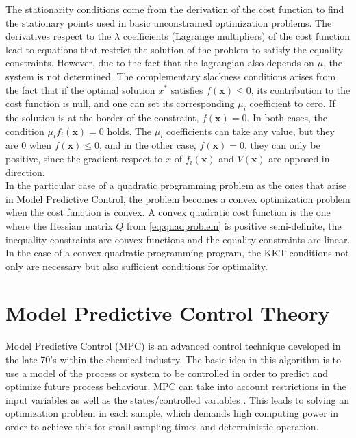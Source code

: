 The stationarity conditions come from the derivation of the cost function to find the stationary points used in basic unconstrained optimization problems. The derivatives respect to the $\lambda$ coefficients (Lagrange multipliers) of the cost function lead to equations that restrict the solution of the problem to satisfy the equality constraints. However, due to the fact that the lagrangian also depends on $\mu$, the system is not determined. The complementary slackness conditions arises from the fact that if the optimal solution $x^{*}$ satisfies $f(\mathbf{x}) \leq 0$, its contribution to the cost function is null, and one can set its corresponding $\mu_{i}$ coefficient to cero. If the solution is at the border of the constraint,  $f(\mathbf{x}) = 0$. In both cases, the condition $\mu_{i} f_{i}(\mathbf{x}) = 0$ holds. The $\mu_{i}$ coefficients can take any value, but they are 0 when $f(\mathbf{x}) \leq 0$, and in the other case, $f(\mathbf{x}) = 0$, they can only be positive, since the gradient respect to $x$ of $f_{i}(\mathbf{x})$ and $V(\mathbf{x})$ are opposed in direction.\\

In the particular case of a quadratic programming problem as the ones that arise in Model Predictive Control, the problem becomes a convex optimization problem when the cost function is convex. A convex quadratic cost function is the one where the Hessian matrix $Q$ from \ref{eq:quadproblem} is positive semi-definite, the inequality constraints are convex functions and the equality constraints are linear. In the case of a convex quadratic programming program, the KKT conditions not only are necessary but also sufficient conditions for optimality.

\section{Model Predictive Control Theory} %

Model Predictive Control (MPC) is an advanced control technique developed in the late 70’s within the chemical industry. The basic idea in this algorithm is to use a model of the process or system to be controlled in order to predict and optimize future process behaviour. MPC can take into account restrictions in the input variables as well as the states/controlled variables \cite{Hovd2004}. This leads to solving an optimization problem in each sample, which demands high computing power in order to achieve this for small sampling times and deterministic operation.\\ 

